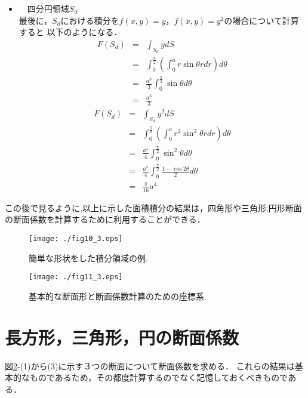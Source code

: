 ﻿\documentclass[10pt,a4j]{jbook}
\begin{document}
\begin{itemize}
\item　四分円領域$S_d$\\
最後に，$S_d$における積分を$f(x,y)=y$，$f(x,y)=y^2$の場合について計算すると
以下のようになる．
\begin{eqnarray}
	F(S_d) 
	&=& \int_{S_d} y dS \nonumber \\
	&=& \int_0^\frac{\pi}{2} \left( \int_0^a r\sin\theta rdr \right)d\theta \nonumber \\
	&=& \frac{a^3}{3}\int_0^\frac{\pi}{2} \sin\theta  d\theta \nonumber \\
	&=& \frac{a^3}{3}
	\label{eqn:int_Sd_y}
\end{eqnarray}
\begin{eqnarray}
	F(S_d) 
	&=& \int_{S_d} y^2 dS \nonumber \\
	&=& \int_0^\frac{\pi}{2} \left( \int_0^a r^2\sin^2\theta rdr \right)d\theta \nonumber \\
	&=& \frac{a^4}{4}\int_0^\frac{\pi}{2} \sin^2\theta d\theta \nonumber \\
	&=& \frac{a^4}{4} \int_0^\frac{\pi}{2} \frac{1-\cos 2\theta}{2} d\theta 
	\nonumber
	\\
	&=& \frac{\pi}{16}a^4
	\label{eqn:int_Sd_y2}
\end{eqnarray}
\end{itemize}
この後で見るように,以上に示した面積積分の結果は，四角形や三角形,円形断面の断面係数を計算するために利用することができる．
\begin{figure}[h]
	\begin{center}
	\texttt{[image: ./fig10\_3.eps]} 
	\end{center}
	\caption{
		簡単な形状をした積分領域の例. 
	} 
	\label{fig:fig10_3}
\end{figure}
\begin{figure}[h]
	\begin{center}
	\texttt{[image: ./fig11\_3.eps]} 
	\end{center}
	\caption{
		基本的な断面形と断面係数計算のための座標系.
	} 
	\label{fig:fig11_3}
\end{figure}
\section{長方形，三角形，円の断面係数}
図\ref{fig:fig11_3}-(1)から(3)に示す３つの断面について断面係数を求める．
これらの結果は基本的なものであるため，その都度計算するのでなく記憶しておくべきものである．
\end{document}
